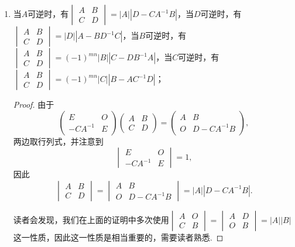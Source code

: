 \begin{enumerate}
    \item 当$A$可逆时，有$\begin{vmatrix}
                  A & B \\ C & D
              \end{vmatrix} = |A||D-CA^{-1}B|$，当$D$可逆时，有$\begin{vmatrix}
                  A & B \\ C & D
              \end{vmatrix} = |D||A-BD^{-1}C|$，当$B$可逆时，有$\begin{vmatrix}
                  A & B \\ C & D
              \end{vmatrix} = (-1)^{mn}|B||C-DB^{-1}A|$，当$C$可逆时，有$\begin{vmatrix}
                  A & B \\ C & D
              \end{vmatrix} = (-1)^{mn}|C||B-AC^{-1}D|$；
    \begin{proof}
        由于
        \[\begin{pmatrix}
            E & O \\ -CA^{-1} & E
        \end{pmatrix}\begin{pmatrix}
            A & B \\ C & D
        \end{pmatrix}= \begin{pmatrix}
            A & B \\ O & D-CA^{-1}B
        \end{pmatrix},\]
        两边取行列式，并注意到
        \[\begin{vmatrix}
            E & O \\ -CA^{-1} & E
        \end{vmatrix}=1,\]
        因此
        \[\begin{vmatrix}
            A & B \\ C & D
        \end{vmatrix}=\begin{vmatrix}
            A & B \\ O & D-CA^{-1}B
        \end{vmatrix}=|A||D-CA^{-1}B|.\]

        读者会发现，我们在上面的证明中多次使用$\begin{vmatrix}
            A & O \\ C & B
        \end{vmatrix} = \begin{vmatrix}
            A & D \\ O & B
        \end{vmatrix} = |A||B|$这一性质，因此这一性质是相当重要的，需要读者熟悉.


\end{proof}
\end{enumerate}
